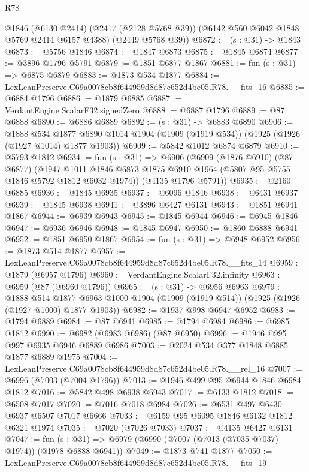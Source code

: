 \begin{lexlean}{R78}
\begin{coremodule}
      @1846
      (@6130 @2414)
      (@2417 (@2128 @5768 @39))
      (@6142 @560 @6042 @1848 @5769 @2414 @6157 @4388)
      (@2449 @5768 @39))
@6872 := (s : @31) -> @1843
@6873 := @5756 @1846
@6874 := @1847 @6873
@6875 := @1845 @6874
@6877 := @3896 @1796 @5791
@6879 := @1851 @6877 @1867
@6881 := fun (s : @31) => @6875 @6879
@6883 := @1873 @534 @1877
@6884 := LexLeanPreserve.C69a0078cb8f644959d8d87c652d4be05.R78.__fits_16
@6885 := @6884 @1796
@6886 := @1879 @6885
@6887 := VerdantEngine.ScalarF32.signedZero
@6888 := @6887 @1796
@6889 := @87 @6888
@6890 := @6886 @6889
@6892 := (s : @31) -> @6883 @6890
@6906 := @1888
    @534
    @1877
    @6890
    @1014
    @1904
    (@1909 (@1919 @534))
    (@1925 (@1926 (@1927 @1014) @1877 @1903))
@6909 := @5842 @1012 @6874 @6879
@6910 := @5793 @1812
@6934 := fun (s : @31) =>
  @6906
    (@6909
      (@1876 @6910)
      (@87 @6877)
      (@1947 @1011 @1846 @6873 @1875 @6910 @1964 (@5807 @95 @5755 @1846 @5792 @1812 @6032 @1974))
      (@4135 @1796 @5791))
@6935 := @2160 @6885
@6936 := @1845 @6935
@6937 := @6096 @1846
@6938 := @6431 @6937
@6939 := @1845 @6938
@6941 := @3896 @6427 @6131
@6943 := @1851 @6941 @1867
@6944 := @6939 @6943
@6945 := @1845 @6944
@6946 := @6945 @1846
@6947 := @6936 @6946
@6948 := @1845 @6947
@6950 := @1860 @6888 @6941
@6952 := @1851 @6950 @1867
@6954 := fun (s : @31) => @6948 @6952
@6956 := @1873 @514 @1877
@6957 := LexLeanPreserve.C69a0078cb8f644959d8d87c652d4be05.R78.__fits_14
@6959 := @1879 (@6957 @1796)
@6960 := VerdantEngine.ScalarF32.infinity
@6963 := @6959 (@87 (@6960 @1796))
@6965 := (s : @31) -> @6956 @6963
@6979 := @1888
    @514
    @1877
    @6963
    @1000
    @1904
    (@1909 (@1919 @514))
    (@1925 (@1926 (@1927 @1000) @1877 @1903))
@6982 := @1937 @998 @6947 @6952
@6983 := @1794 @6889
@6984 := @87 @6941
@6985 := @1794 @6984
@6986 := @6985 @1812
@6990 := @6982 (@6983 @6986) (@87 @6950)
@6996 := @1946 @995 @997 @6935 @6946 @6889 @6986
@7003 := @2024 @534 @377 @1848 @6885 @1877 @6889 @1975
@7004 := LexLeanPreserve.C69a0078cb8f644959d8d87c652d4be05.R78.__rel_16
@7007 := @6996 (@7003 (@7004 @1796))
@7013 := @1946 @499 @95 @6944 @1846 @6984 @1812
@7016 := @5842 @498 @6938 @6943
@7017 := @6133 @1812
@7018 := @6508 @7017
@7020 := @7016 @7018 @6984
@7026 := @6531 @497 @6430 @6937 @6507 @7017 @6666
@7033 := @6159 @95 @6095 @1846 @6132 @1812 @6321 @1974
@7035 := @7020 (@7026 @7033)
@7037 := @4135 @6427 @6131
@7047 := fun (s : @31) => @6979 (@6990 (@7007 (@7013 (@7035 @7037) @1974)) (@1978 @6888 @6941))
@7049 := @1873 @741 @1877
@7050 := LexLeanPreserve.C69a0078cb8f644959d8d87c652d4be05.R78.__fits_19

\end{coremodule}
\end{lexlean}
